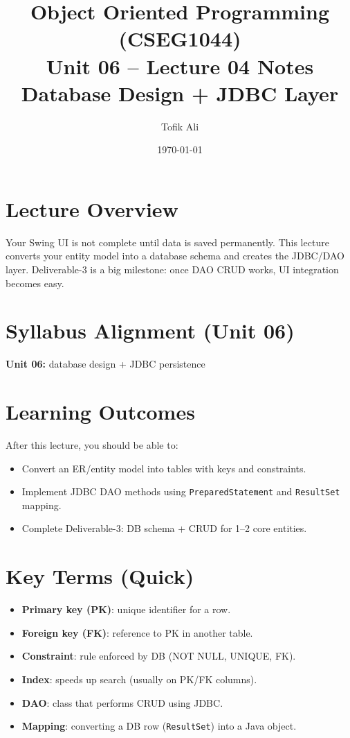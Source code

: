 \documentclass[11pt]{article}
\title{Object Oriented Programming (CSEG1044)\\Unit 06 -- Lecture 04 Notes\\Database Design + JDBC Layer}
\author{Tofik Ali}
\date{\today}
\begin{document}
\maketitle
\tableofcontents

\section{Lecture Overview}
Your Swing UI is not complete until data is saved permanently.
This lecture converts your entity model into a database schema and creates the JDBC/DAO layer.
Deliverable-3 is a big milestone: once DAO CRUD works, UI integration becomes easy.
\notesources{\OOPSUnitVISources}

\section{Syllabus Alignment (Unit 06)}
\textbf{Unit 06:} database design + JDBC persistence

\section{Learning Outcomes}
After this lecture, you should be able to:
\begin{itemize}
  \item Convert an ER/entity model into tables with keys and constraints.
  \item Implement JDBC DAO methods using \texttt{PreparedStatement} and \texttt{ResultSet} mapping.
  \item Complete Deliverable-3: DB schema + CRUD for 1--2 core entities.
\end{itemize}

\section{Key Terms (Quick)}
\begin{itemize}
  \item \textbf{Primary key (PK)}: unique identifier for a row.
  \item \textbf{Foreign key (FK)}: reference to PK in another table.
  \item \textbf{Constraint}: rule enforced by DB (NOT NULL, UNIQUE, FK).
  \item \textbf{Index}: speeds up search (usually on PK/FK columns).
  \item \textbf{DAO}: class that performs CRUD using JDBC.
  \item \textbf{Mapping}: converting a DB row (\texttt{ResultSet}) into a Java object.
\end{itemize}
\end{document}
